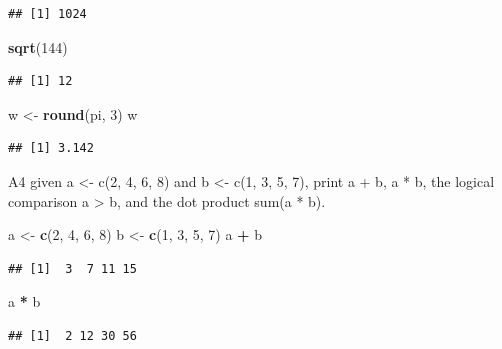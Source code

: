 \documentclass[
]{article}
\newenvironment{Shaded}{\begin{snugshade}}{\end{snugshade}}
\newcommand{\DecValTok}[1]{\textcolor[rgb]{0.00,0.00,0.81}{#1}}
\newcommand{\FunctionTok}[1]{\textcolor[rgb]{0.13,0.29,0.53}{\textbf{#1}}}
\newcommand{\NormalTok}[1]{#1}
\newcommand{\OtherTok}[1]{\textcolor[rgb]{0.56,0.35,0.01}{#1}}
\newcommand{\SpecialCharTok}[1]{\textcolor[rgb]{0.81,0.36,0.00}{\textbf{#1}}}
\begin{document}
\begin{verbatim}
## [1] 1024
\end{verbatim}

\begin{Shaded}
\begin{Highlighting}[]
\FunctionTok{sqrt}\NormalTok{(}\DecValTok{144}\NormalTok{)}
\end{Highlighting}
\end{Shaded}

\begin{verbatim}
## [1] 12
\end{verbatim}

\begin{Shaded}
\begin{Highlighting}[]
\NormalTok{w }\OtherTok{\textless{}{-}} \FunctionTok{round}\NormalTok{(pi, }\DecValTok{3}\NormalTok{)}
\NormalTok{w}
\end{Highlighting}
\end{Shaded}

\begin{verbatim}
## [1] 3.142
\end{verbatim}

A4 given a \textless- c(2, 4, 6, 8) and b \textless- c(1, 3, 5, 7),
print a + b, a * b, the logical comparison a \textgreater{} b, and the
dot product sum(a * b).

\begin{Shaded}
\begin{Highlighting}[]
\NormalTok{a }\OtherTok{\textless{}{-}} \FunctionTok{c}\NormalTok{(}\DecValTok{2}\NormalTok{, }\DecValTok{4}\NormalTok{, }\DecValTok{6}\NormalTok{, }\DecValTok{8}\NormalTok{)}
\NormalTok{b }\OtherTok{\textless{}{-}} \FunctionTok{c}\NormalTok{(}\DecValTok{1}\NormalTok{, }\DecValTok{3}\NormalTok{, }\DecValTok{5}\NormalTok{, }\DecValTok{7}\NormalTok{)}
\NormalTok{a }\SpecialCharTok{+}\NormalTok{ b}
\end{Highlighting}
\end{Shaded}

\begin{verbatim}
## [1]  3  7 11 15
\end{verbatim}

\begin{Shaded}
\begin{Highlighting}[]
\NormalTok{a }\SpecialCharTok{*}\NormalTok{ b}
\end{Highlighting}
\end{Shaded}

\begin{verbatim}
## [1]  2 12 30 56
\end{verbatim}
\end{document}

